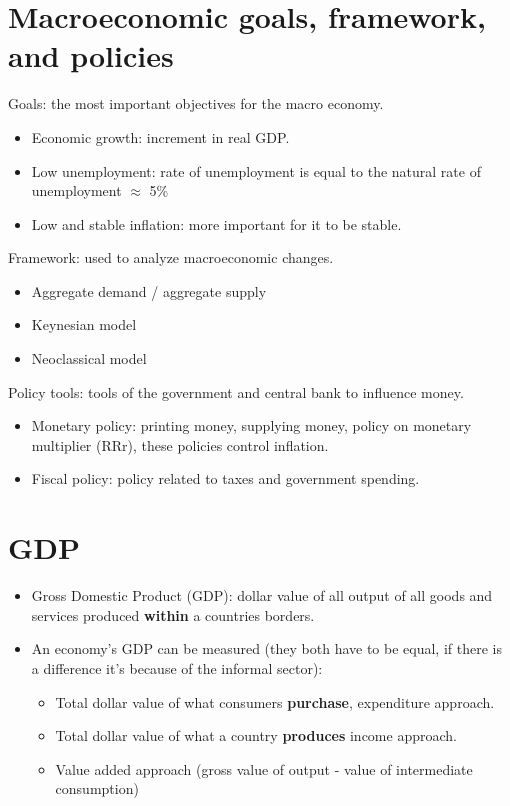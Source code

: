 \documentclass[openany]{book}
\begin{document}
\section{Macroeconomic goals, framework, and policies}
Goals: the most important objectives for the macro economy. 
\begin{itemize}
    \item Economic growth: increment in real GDP.
    \item Low unemployment: rate of unemployment is equal to the natural rate of unemployment $\approx$ 5\%
    \item Low and stable inflation: more important for it to be stable.
\end{itemize}
Framework: used to analyze macroeconomic changes. 
\begin{itemize}
    \item Aggregate demand / aggregate supply
    \item Keynesian model
    \item Neoclassical model 
\end{itemize}
Policy tools: tools of the government and central bank to influence money. 
\begin{itemize}
    \item Monetary policy: printing money, supplying money, policy on monetary multiplier (RRr), these policies control inflation. 
    \item Fiscal policy: policy related to taxes and government spending.
\end{itemize}

\section{GDP}
\begin{itemize}
    \item Gross Domestic Product (GDP): dollar value of all output of all goods and services produced \textbf{within} a countries borders. 
    \item An economy's GDP can be measured (they both have to be equal, if there is a difference it's because of the informal sector): 
        \begin{itemize}
            \item Total dollar value of what consumers \textbf{purchase}, expenditure approach.
            \item Total dollar value of what a country \textbf{produces} income approach.
            \item Value added approach (gross value of output - value of intermediate consumption)
        \end{itemize}
\end{itemize}
\end{document}
